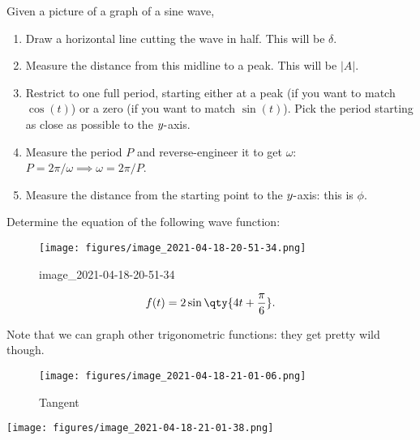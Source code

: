 \begin{proposition}

Given a picture of a graph of a sine wave,

\begin{enumerate}
\def\labelenumi{\arabic{enumi}.}
\tightlist
\item
  Draw a horizontal line cutting the wave in half. This will be
  \(\delta\).
\item
  Measure the distance from this midline to a peak. This will be
  \({\left\lvert {A} \right\rvert}\).
\item
  Restrict to one full period, starting either at a peak (if you want to
  match \(\cos(t)\)) or a zero (if you want to match \(\sin(t)\)). Pick
  the period starting as close as possible to the \(y{\hbox{-}}\)axis.
\item
  Measure the period \(P\) and reverse-engineer it to get \(\omega\):
  \(P = 2\pi/\omega \implies \omega = 2\pi/P\).
\item
  Measure the distance from the starting point to the
  \(y{\hbox{-}}\)axis: this is \(\phi\).
\end{enumerate}

\end{proposition}

\begin{example}[?]

Determine the equation of the following wave function:

\begin{figure}
\centering
\texttt{[image: figures/image\_2021-04-18-20-51-34.png]}
\caption{image\_2021-04-18-20-51-34}
\end{figure}

\begin{solution}

\begin{align*}
f(t) = 2\sin\qty{4t + {\pi \over 6} }
.\end{align*}

\end{solution}

\end{example}

\begin{remark}

Note that we can graph other trigonometric functions: they get pretty
wild though.

\begin{figure}
\centering
\texttt{[image: figures/image\_2021-04-18-21-01-06.png]}
\caption{Tangent}
\end{figure}

\texttt{[image: figures/image\_2021-04-18-21-01-38.png]}

\end{remark}

